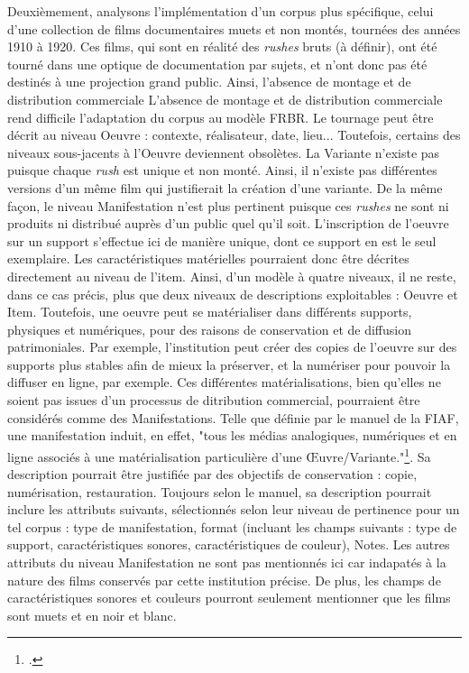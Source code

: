 Deuxièmement, analysons l'implémentation d'un corpus plus spécifique, celui d'une collection de films documentaires muets et non montés, tournées des années 1910 à 1920. Ces films, qui sont en réalité des \textit{rushes} bruts (à définir), ont été tourné dans une optique de documentation par sujets, et n'ont donc pas été destinés à une projection grand public. Ainsi, l'absence de montage et de distribution commerciale 
L'absence de montage et de distribution commerciale rend difficile l'adaptation du corpus au modèle FRBR. Le tournage peut être décrit au niveau Oeuvre : contexte, réalisateur, date, lieu... Toutefois, certains des niveaux sous-jacents à l'Oeuvre deviennent obsolètes. La Variante n'existe pas puisque chaque \textit{rush} est unique et non monté. Ainsi, il n'existe pas différentes versions d'un même film qui justifierait la création d'une variante. 
De la même façon, le niveau Manifestation n'est plus pertinent puisque ces \textit{rushes} ne sont ni produits ni distribué auprès d'un public quel qu'il soit. L'inscription de l'oeuvre sur un support s'effectue ici de manière unique, dont ce support en est le seul exemplaire. Les caractéristiques matérielles pourraient donc être décrites directement au niveau de l'item.  Ainsi, d'un modèle à quatre niveaux, il ne reste, dans ce cas précis, plus que deux niveaux de descriptions exploitables : Oeuvre et Item. Toutefois, une oeuvre peut se matérialiser dans différents supports, physiques et numériques, pour des raisons de conservation et de diffusion patrimoniales. Par exemple, l'institution peut créer des copies de l'oeuvre sur des supports plus stables afin de mieux la préserver, et la numériser pour pouvoir la diffuser en ligne, par exemple. Ces différentes matérialisations, bien qu'elles ne soient pas issues d'un processus de ditribution commercial, pourraient être considérés comme des Manifestations. Telle que définie par le manuel de la FIAF, une manifestation induit, en effet, "tous les médias analogiques, numériques et en ligne associés à une matérialisation particulière d'une Œuvre/Variante."\footcite{zotero-item-646}. Sa description pourrait être justifiée par des objectifs de conservation : copie, numérisation, restauration. Toujours selon le manuel, sa description pourrait inclure les attributs suivants, sélectionnés selon leur niveau de pertinence pour un tel corpus : type de manifestation, format (incluant les champs suivants : type de support, caractéristiques sonores, caractéristiques de couleur), Notes. Les autres attributs du niveau Manifestation ne sont pas mentionnés ici car indapatés à la nature des films conservés par cette institution précise. De plus, les champs de caractéristiques sonores et couleurs pourront seulement mentionner que les films sont muets et en noir et blanc. 
